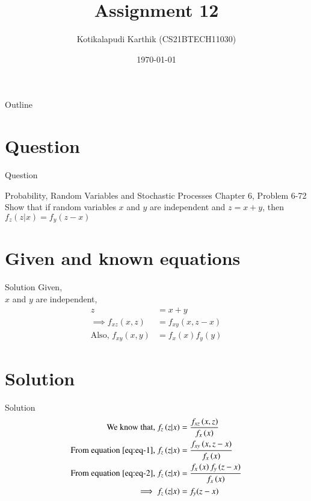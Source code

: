 \documentclass{beamer}
\title{Assignment 12}
\author{Kotikalapudi Karthik (CS21BTECH11030)}
\date{\today}
\providecommand{\brak}[1]{\ensuremath{\left(#1\right)}}
\begin{document}
\begin{frame}
    \titlepage 
\end{frame}

\logo{}


\begin{frame}{Outline}
    \tableofcontents
\end{frame}

\section{Question}
\begin{frame}{Question}
    \begin{block}{Probability, Random Variables and Stochastic Processes Chapter 6, Problem 6-72}  
        Show that if random variables $x$ and $y$ are independent and $z=x+y$, then $f_z(z|x)=f_y(z-x)$
    \end{block}
\end{frame}

\section{Given and known equations}
\begin{frame}{Solution}
    Given,\\
    $x$ and $y$ are independent,
    \begin{align}
        z &= x+y
        \\
        \implies f_{xz}\brak{x,z} &= f_{xy}\brak{x,z-x}
        \label{eq:eq-1}
        \\
        \text{Also, } f_{xy}\brak{x,y} &= f_x\brak{x}f_y\brak{y}
        \label{eq:eq-2}
    \end{align}
\end{frame}

\section{Solution}
\begin{frame}{Solution}
    \begin{align}
        \text{We know that, } f_z\brak{z|x} &= \frac{f_{xz}\brak{x,z}}{f_x\brak{x}}
        \\
        \text{From equation \eqref{eq:eq-1}, } f_z\brak{z|x} &= \frac{f_{xy}\brak{x,z-x}}{f_x\brak{x}}
        \\
        \text{From equation \eqref{eq:eq-2}, } f_z\brak{z|x} &= \frac{f_{x}\brak{x}f_y\brak{z-x}}{f_x\brak{x}}
        \\
        \implies f_z\brak{z|x} &= f_y(z-x) 
    \end{align}
\end{frame}
\end{document}
